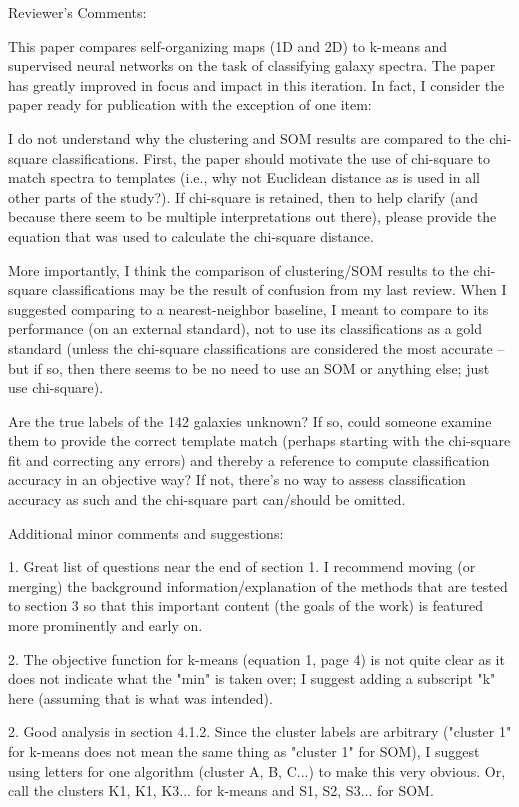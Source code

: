 Reviewer's Comments:

This paper compares self-organizing maps (1D and 2D) to k-means and supervised neural networks on the task of classifying galaxy spectra. The paper has greatly improved in focus and impact in this iteration. In fact, I consider the paper ready for publication with the exception of one item:

I do not understand why the clustering and SOM results are compared to the chi-square classifications.  First, the paper should motivate the use of chi-square to match spectra to templates (i.e., why not Euclidean distance as is used in all other parts of the study?).  If chi-square is retained, then to help clarify (and because there seem to be multiple interpretations out there), please provide the equation that was used to calculate the chi-square distance.

More importantly, I think the comparison of clustering/SOM results to the chi-square classifications may be the result of confusion from my last review.  When I suggested comparing to a nearest-neighbor baseline, I meant to compare to its performance (on an external standard), not to use its classifications as a gold standard (unless the chi-square classifications are considered the most accurate -- but if so, then there seems to be no need to use an SOM or anything else; just use chi-square).

Are the true labels of the 142 galaxies unknown?  If so, could someone examine them to provide the correct template match (perhaps starting with the chi-square fit and correcting any errors) and thereby a reference to compute classification accuracy in an objective way?  If not, there's no way to assess classification accuracy as such and the chi-square part can/should be omitted.

Additional minor comments and suggestions:

1. Great list of questions near the end of section 1.  I recommend moving (or merging) the background information/explanation of the methods that are tested to section 3 so that this important content (the goals of the work) is featured more prominently and early on.

2. The objective function for k-means (equation 1, page 4) is not quite clear as it does not indicate what the "min" is taken over; I suggest adding a subscript "k" here (assuming that is what was intended).

2. Good analysis in section 4.1.2.  Since the cluster labels are arbitrary ("cluster 1" for k-means does not mean the same thing as "cluster 1" for SOM), I suggest using letters for one algorithm (cluster A, B, C...) to make this very obvious.  Or, call the clusters K1, K1, K3... for k-means and S1, S2, S3... for SOM.

